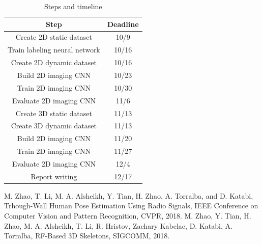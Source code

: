 \documentclass[10pt,twocolumn,letterpaper]{article}
\begin{document}
\begin{table}[]
	\begin{tabular}{|c|c|}
		\hline
		Step & Deadline \\ \hline
		Create 2D static dataset  &  10/9 \\ \hline
		Train labeling neural network & 10/16 \\ \hline
	    Create 2D dynamic dataset & 10/16 \\ \hline
	    Build 2D imaging CNN & 10/23 \\ \hline
	    Train 2D imaging CNN & 10/30 \\ \hline
	    Evaluate 2D imaging CNN & 11/6 \\ \hline
		Create 3D static dataset  & 11/13 \\ \hline
		Create 3D dynamic dataset & 11/13 \\ \hline
		Build 2D imaging CNN & 11/20 \\ \hline
		Train 2D imaging CNN & 11/27 \\ \hline
		Evaluate 2D imaging CNN & 12/4 \\ \hline
		Report writing & 12/17 \\ \hline
	\end{tabular}
	\caption{Steps and timeline}
\end{table}

\begin{thebibliography}{999}
		M. Zhao, T. Li, M. A. Alsheikh, Y. Tian, H. Zhao, A. Torralba, and D. Katabi,
		Trhough-Wall Human Pose Estimation Using Radio Signals,
		IEEE Conference on Computer Vision and Pattern Recognition, CVPR, 2018.
		M. Zhao, Y. Tian, H. Zhao, M. A. Alsheikh, T. Li, R. Hristov, Zachary Kabelac, D. Katabi, A. Torralba,
		RF-Based 3D Skeletons, SIGCOMM, 2018.

\end{thebibliography}
\end{document}

